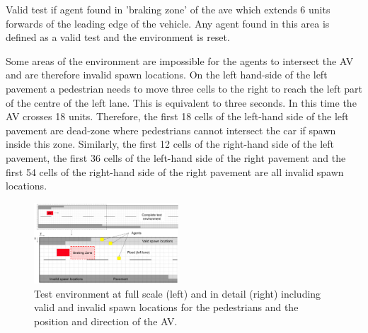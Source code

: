 \documentclass[letterpaper, 10 pt, journal, twoside]{IEEEtran}
\begin{document}
Valid test if agent found in 'braking zone' of the ave which extends 6 units forwards of the leading edge of the vehicle. Any agent found in this area is defined as a valid test and the environment is reset.

Some areas of the environment are impossible for the agents to intersect the AV and are therefore invalid spawn locations. On the left hand-side of the left pavement a pedestrian needs to move three cells to the right to reach the left part of the centre of the left lane. This is equivalent to three seconds. In this time the AV crosses 18 units. Therefore, the first 18 cells of the left-hand side of the left pavement are dead-zone where pedestrians cannot intersect the car if spawn inside this zone. Similarly, the first 12 cells of the right-hand side of the left pavement, the first 36 cells of the left-hand side of the right pavement and the first 54 cells of the right-hand side of the right pavement are all invalid spawn locations. 




\begin{figure}[!t]
	\centering
\includegraphics[width=0.48\textwidth]{RoadLayout.pdf}
	\caption{Test environment at full scale (left) and in detail (right) including valid and invalid spawn locations for the pedestrians and the position and direction of the AV.}
	\label{gridRoad}
\end{figure}
\end{document}
